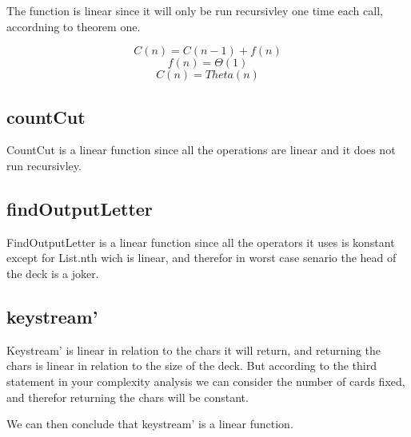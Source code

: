 \documentclass[12pt, a4paper]{article}
\begin{document}
The function is linear since it will only be run recursivley one time each call, accordning to theorem one.

$$C(n) = C(n-1) + f(n)$$
$$f(n) = \Theta(1)$$
$$ C(n) = Theta(n)$$

\subsection{countCut}
CountCut is a linear function since all the operations are linear and it does not run recursivley.

\subsection{findOutputLetter}
FindOutputLetter is a linear function since all the operators it uses is konstant except for List.nth wich is linear, and therefor in worst case senario the head of the deck is a joker.

\subsection{keystream'}
Keystream' is linear in relation to the chars it will return, and returning the chars is linear in relation to the size of the deck. But according to the third statement in your complexity analysis we can consider the number of cards fixed, and therefor returning the chars will be constant. 

We can then conclude that keystream' is a linear function.
\end{document}
